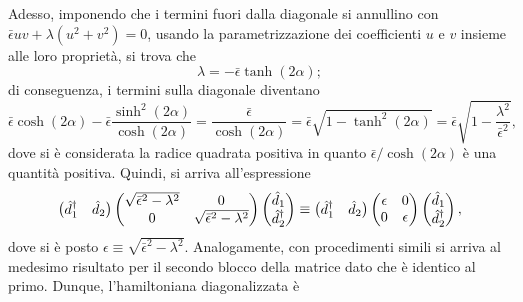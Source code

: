 Adesso, imponendo che i termini fuori dalla diagonale si annullino con $\bar{\epsilon} uv + \lambda(u^2 + v^2) = 0$, usando la parametrizzazione dei coefficienti $u$ e $v$ insieme alle loro proprietà, si trova che 
\begin{equation}
    \lambda = -\bar{\epsilon}\tanh{(2\alpha)};
\end{equation}
di conseguenza, i termini sulla diagonale diventano
\begin{equation}
    \bar{\epsilon}\cosh{(2\alpha)} - \bar{\epsilon}\frac{\sinh^2{(2\alpha)}}{\cosh{(2\alpha)}} = \frac{\bar{\epsilon}}{\cosh{(2\alpha)}} = \bar{\epsilon}\sqrt{1 - \tanh^2{(2\alpha)}} = \bar{\epsilon}\sqrt{1 - \frac{\lambda^2}{\bar{\epsilon}^2}},
\end{equation}
dove si è considerata la radice quadrata positiva in quanto $\bar{\epsilon}/\cosh{(2\alpha)}$ è una quantità positiva. Quindi, si arriva all'espressione
\begin{equation}
    \begin{pmatrix}
        \hat{d}^\dagger_1 & \hat{d}_2
    \end{pmatrix}
    \begin{pmatrix}
        \sqrt{\bar{\epsilon}^2 - \lambda^2} & 0 \\
        0 & \sqrt{\bar{\epsilon}^2 - \lambda^2}
    \end{pmatrix}
    \begin{pmatrix}
        \hat{d}_1 \\
        \hat{d}^\dagger_2
    \end{pmatrix} \equiv 
    \begin{pmatrix}
        \hat{d}^\dagger_1 & \hat{d}_2
    \end{pmatrix}
    \begin{pmatrix}
        \epsilon & 0 \\
        0 & \epsilon
    \end{pmatrix}
    \begin{pmatrix}
        \hat{d}_1 \\
        \hat{d}^\dagger_2
    \end{pmatrix},
\end{equation}
dove si è posto $\epsilon \equiv \sqrt{\bar{\epsilon}^2 - \lambda^2}$. Analogamente, con procedimenti simili si arriva al medesimo risultato per il secondo blocco della matrice dato che è identico al primo. Dunque, l'hamiltoniana diagonalizzata è
